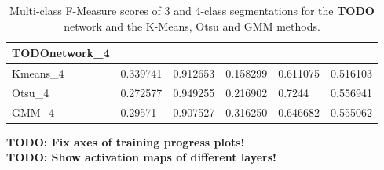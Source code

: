 \begin {table}
\begin{flushleft}
\begin {tabular}[!htb]{|l|l|l|l|l|l|}
			\textbf{TODOnetwork}\_4& & & & &  \\ \hline
			Kmeans\_4& 0.339741& 0.912653& 0.158299& 0.611075& 0.516103 \\ \hline
			Otsu\_4& 0.272577& 0.949255& 0.216902& 0.7244& 0.556941 \\ \hline
			GMM\_4& 0.29571& 0.907527& 0.316250& 0.646682& 0.555062 \\ \hline
		\end {tabular}
	\end {flushleft}
\caption[Multi-class F-Measure scores for final network and other image segmentation metods.]{Multi-class F-Measure scores of 3 and 4-class segmentations for the \textbf{TODO} network and the K-Means, Otsu and GMM methods.}
\label{tab:resultsfinal}
\end {table}

\textbf{TODO: Fix axes of training progress plots!}\\
\textbf{TODO: Show activation maps of different layers!}\\